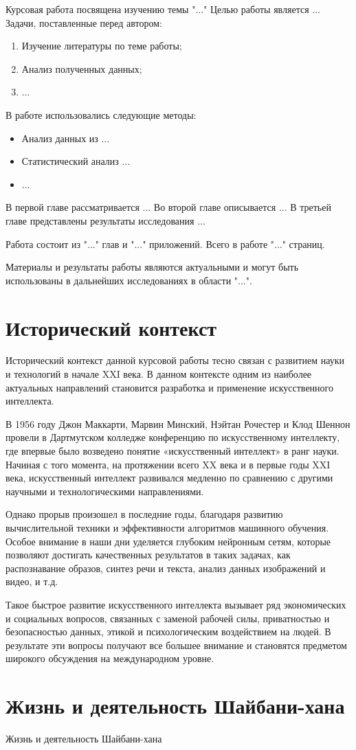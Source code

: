 \documentclass[draft]{article}
\begin{document}
Курсовая работа посвящена изучению темы "..."
Целью работы является ...
Задачи, поставленные перед автором:
\begin{enumerate}
    \item Изучение литературы по теме работы;
    \item Анализ полученных данных;
    \item ...
\end{enumerate}

В работе использовались следующие методы:
\begin{itemize}
    \item Анализ данных из ...
    \item Статистический анализ ...
    \item ...
\end{itemize}

В первой главе рассматривается ...
Во второй главе описывается ...
В третьей главе представлены результаты исследования ...

Работа состоит из "..." глав и "..." приложений. Всего в работе "..." страниц.

Материалы и результаты работы являются актуальными и могут быть использованы в дальнейших исследованиях в области "...".\newpage\section{Исторический контекст}
Исторический контекст данной курсовой работы тесно связан с развитием науки и технологий в начале XXI века. В данном контексте одним из наиболее актуальных направлений становится разработка и применение искусственного интеллекта.

В 1956 году Джон Маккарти, Марвин Минский, Нэйтан Рочестер и Клод Шеннон провели в Дартмутском колледже конференцию по искусственному интеллекту, где впервые было возведено понятие «искусственный интеллект» в ранг науки. Начиная с того момента, на протяжении всего XX века и в первые годы XXI века, искусственный интеллект развивался медленно по сравнению с другими научными и технологическими направлениями.

Однако прорыв произошел в последние годы, благодаря развитию вычислительной техники и эффективности алгоритмов машинного обучения. Особое внимание в наши дни уделяется глубоким нейронным сетям, которые позволяют достигать качественных результатов в таких задачах, как распознавание образов, синтез речи и текста, анализ данных изображений и видео, и т.д.

Такое быстрое развитие искусственного интеллекта вызывает ряд экономических и социальных вопросов, связанных с заменой рабочей силы, приватностью и безопасностью данных, этикой и психологическим воздействием на людей. В результате эти вопросы получают все большее внимание и становятся предметом широкого обсуждения на международном уровне.\newpage\section{Жизнь и деятельность Шайбани-хана}
Жизнь и деятельность Шайбани-хана
\end{document}
